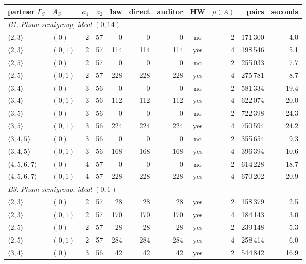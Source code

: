 \begin{tabular}{llrrrrrcrrr}
\toprule
partner $\Gamma_S$ & $A_S$ & $a_1$ & $a_2$ & law & direct & auditor & HW & $\mu(A)$ & pairs & seconds\\
\midrule
\multicolumn{11}{l}{\emph{B1: Pham semigroup, ideal $(0,14)$}}\\
$ \langle 2,3\rangle  $ & $(0)$ & 2 & 57 & 0 & 0 & 0 & no & 2 & 171\,300 & 4.0 \\
$ \langle 2,3\rangle  $ & $(0,1)$ & 2 & 57 & 114 & 114 & 114 & yes & 4 & 198\,546 & 5.1 \\
$ \langle 2,5\rangle  $ & $(0)$ & 2 & 57 & 0 & 0 & 0 & no & 2 & 255\,033 & 7.7 \\
$ \langle 2,5\rangle  $ & $(0,1)$ & 2 & 57 & 228 & 228 & 228 & yes & 4 & 275\,781 & 8.7 \\
$ \langle 3,4\rangle  $ & $(0)$ & 3 & 56 & 0 & 0 & 0 & no & 2 & 581\,334 & 19.4 \\
$ \langle 3,4\rangle  $ & $(0,1)$ & 3 & 56 & 112 & 112 & 112 & yes & 4 & 622\,074 & 20.0 \\
$ \langle 3,5\rangle  $ & $(0)$ & 3 & 56 & 0 & 0 & 0 & no & 2 & 722\,398 & 24.3 \\
$ \langle 3,5\rangle  $ & $(0,1)$ & 3 & 56 & 224 & 224 & 224 & yes & 4 & 750\,594 & 24.2 \\
$ \langle 3,4,5\rangle  $ & $(0)$ & 3 & 56 & 0 & 0 & 0 & no & 2 & 355\,654 & 9.3 \\
$ \langle 3,4,5\rangle  $ & $(0,1)$ & 3 & 56 & 168 & 168 & 168 & yes & 4 & 396\,394 & 10.6 \\
$ \langle 4,5,6,7\rangle  $ & $(0)$ & 4 & 57 & 0 & 0 & 0 & no & 2 & 614\,228 & 18.7 \\
$ \langle 4,5,6,7\rangle  $ & $(0,1)$ & 4 & 57 & 228 & 228 & 228 & yes & 4 & 670\,202 & 20.9 \\
\multicolumn{11}{l}{\emph{B3: Pham semigroup, ideal $(0,1)$}}\\
$ \langle 2,3\rangle  $ & $(0)$ & 2 & 57 & 28 & 28 & 28 & yes & 2 & 158\,379 & 2.5 \\
$ \langle 2,3\rangle  $ & $(0,1)$ & 2 & 57 & 170 & 170 & 170 & yes & 4 & 184\,143 & 3.0 \\
$ \langle 2,5\rangle  $ & $(0)$ & 2 & 57 & 28 & 28 & 28 & yes & 2 & 239\,148 & 5.3 \\
$ \langle 2,5\rangle  $ & $(0,1)$ & 2 & 57 & 284 & 284 & 284 & yes & 4 & 258\,414 & 6.0 \\
$ \langle 3,4\rangle  $ & $(0)$ & 3 & 56 & 42 & 42 & 42 & yes & 2 & 544\,842 & 16.9 \\

\end{tabular}
